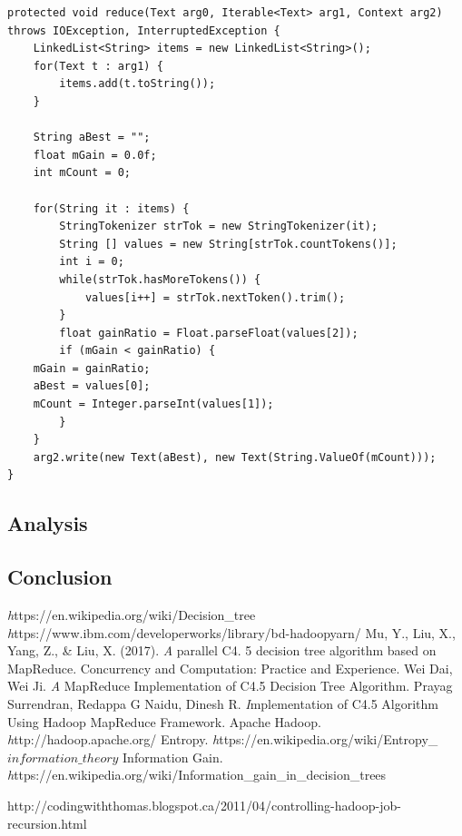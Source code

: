 \documentclass{article}
\begin{document}
\begin{lstlisting}[caption={Attrib Selection Reducer 2 code snippet},label={lst:attrselred},style=MyJavaStyle]
protected void reduce(Text arg0, Iterable<Text> arg1, Context arg2)
throws IOException, InterruptedException {
    LinkedList<String> items = new LinkedList<String>();
    for(Text t : arg1) {
        items.add(t.toString());
    }

    String aBest = "";
    float mGain = 0.0f;
    int mCount = 0;

    for(String it : items) {
        StringTokenizer strTok = new StringTokenizer(it);
        String [] values = new String[strTok.countTokens()];
        int i = 0;
        while(strTok.hasMoreTokens()) {
            values[i++] = strTok.nextToken().trim();
        }
        float gainRatio = Float.parseFloat(values[2]);
        if (mGain < gainRatio) {
	mGain = gainRatio;
	aBest = values[0];
	mCount = Integer.parseInt(values[1]);
        }
    }
    arg2.write(new Text(aBest), new Text(String.ValueOf(mCount)));
}
\end{lstlisting}

\subsection{Analysis}

\subsection{Conclusion}

\begin{thebibliography}{9}
\textit https://en.wikipedia.org/wiki/Decision\_tree
\textit https://www.ibm.com/developerworks/library/bd-hadoopyarn/
Mu, Y., Liu, X., Yang, Z., \& Liu, X. (2017).
\textit A parallel C4. 5 decision tree algorithm based on MapReduce. Concurrency and Computation: Practice and Experience.
Wei Dai, Wei Ji.
\textit A MapReduce Implementation of C4.5 Decision Tree Algorithm.
Prayag Surrendran, Redappa G Naidu, Dinesh R.
\textit Implementation of C4.5 Algorithm Using Hadoop MapReduce Framework.
Apache Hadoop.
\textit http://hadoop.apache.org/
Entropy.
\textit https://en.wikipedia.org/wiki/Entropy\_\(information\_theory\)
Information Gain.
\textit https://en.wikipedia.org/wiki/Information\_gain\_in\_decision\_trees
\end{thebibliography}

http://codingwiththomas.blogspot.ca/2011/04/controlling-hadoop-job-recursion.html
\end{document}
